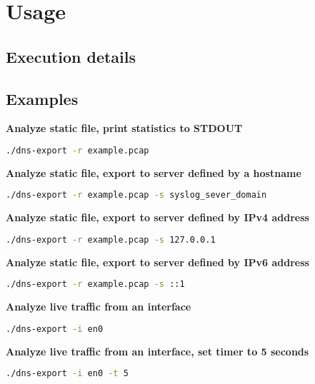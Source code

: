 

\section{Usage}

\subsection{Execution details}



\subsection{Examples}

\vspace{0.5cm}
\textbf{Analyze static file, print statistics to STDOUT}
\begin{lstlisting}[language=Bash] 
./dns-export -r example.pcap
\end{lstlisting}

\vspace{0.5cm}
\textbf{Analyze static file, export to server defined by a hostname}
\begin{lstlisting}[language=Bash] 
./dns-export -r example.pcap -s syslog_sever_domain
\end{lstlisting}

\vspace{0.5cm}
\textbf{Analyze static file, export to server defined by IPv4 address}
\begin{lstlisting}[language=Bash] 
./dns-export -r example.pcap -s 127.0.0.1
\end{lstlisting}

\vspace{0.5cm}
\textbf{Analyze static file, export to server defined by IPv6 address}
\begin{lstlisting}[language=Bash] 
./dns-export -r example.pcap -s ::1
\end{lstlisting}

\vspace{0.5cm}
\textbf{Analyze live traffic from an interface}
\begin{lstlisting}[language=Bash] 
./dns-export -i en0
\end{lstlisting}

\vspace{0.5cm}
\textbf{Analyze live traffic from an interface, set timer to 5 seconds}
\begin{lstlisting}[language=Bash] 
./dns-export -i en0 -t 5
\end{lstlisting}

